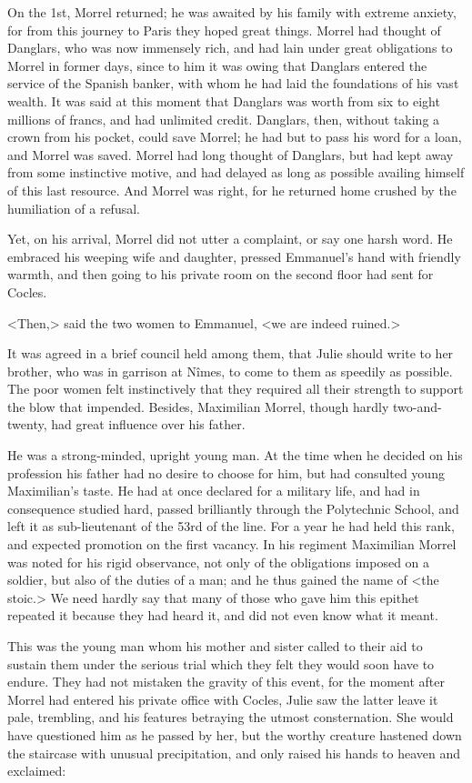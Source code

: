 On the 1st, Morrel returned; he was awaited by his family with extreme anxiety, for from this journey to Paris they hoped great things. Morrel had thought of Danglars, who was now immensely rich, and had lain under great obligations to Morrel in former days, since to him it was owing that Danglars entered the service of the Spanish banker, with whom he had laid the foundations of his vast wealth. It was said at this moment that Danglars was worth from six to eight millions of francs, and had unlimited credit. Danglars, then, without taking a crown from his pocket, could save Morrel; he had but to pass his word for a loan, and Morrel was saved. Morrel had long thought of Danglars, but had kept away from some instinctive motive, and had delayed as long as possible availing himself of this last resource. And Morrel was right, for he returned home crushed by the humiliation of a refusal. 

 Yet, on his arrival, Morrel did not utter a complaint, or say one harsh word. He embraced his weeping wife and daughter, pressed Emmanuel's hand with friendly warmth, and then going to his private room on the second floor had sent for Cocles. 

 <Then,> said the two women to Emmanuel, <we are indeed ruined.> 

 It was agreed in a brief council held among them, that Julie should write to her brother, who was in garrison at Nîmes, to come to them as speedily as possible. The poor women felt instinctively that they required all their strength to support the blow that impended. Besides, Maximilian Morrel, though hardly two-and-twenty, had great influence over his father. 

 He was a strong-minded, upright young man. At the time when he decided on his profession his father had no desire to choose for him, but had consulted young Maximilian's taste. He had at once declared for a military life, and had in consequence studied hard, passed brilliantly through the Polytechnic School, and left it as sub-lieutenant of the 53rd of the line. For a year he had held this rank, and expected promotion on the first vacancy. In his regiment Maximilian Morrel was noted for his rigid observance, not only of the obligations imposed on a soldier, but also of the duties of a man; and he thus gained the name of <the stoic.> We need hardly say that many of those who gave him this epithet repeated it because they had heard it, and did not even know what it meant. 

 This was the young man whom his mother and sister called to their aid to sustain them under the serious trial which they felt they would soon have to endure. They had not mistaken the gravity of this event, for the moment after Morrel had entered his private office with Cocles, Julie saw the latter leave it pale, trembling, and his features betraying the utmost consternation. She would have questioned him as he passed by her, but the worthy creature hastened down the staircase with unusual precipitation, and only raised his hands to heaven and exclaimed: 

